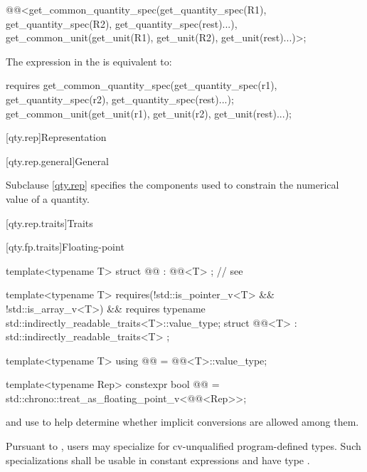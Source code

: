\begin{itemdescr}
\pnum
\returns
\begin{codeblock}
@@<get_common_quantity_spec(get_quantity_spec(R1{}), get_quantity_spec(R2{}),
                                     get_quantity_spec(rest)...),
            get_common_unit(get_unit(R1{}), get_unit(R2{}), get_unit(rest)...)>{};
\end{codeblock}

\pnum
\remarks
The expression in the  is equivalent to:
\begin{codeblock}
requires {
  get_common_quantity_spec(get_quantity_spec(r1), get_quantity_spec(r2),
                           get_quantity_spec(rest)...);
  get_common_unit(get_unit(r1), get_unit(r2), get_unit(rest)...);
}
\end{codeblock}
\end{itemdescr}

[qty.rep]{Representation}

[qty.rep.general]{General}

\pnum
Subclause \ref{qty.rep} specifies the components
used to constrain the numerical value of a quantity.

[qty.rep.traits]{Traits}

[qty.fp.traits]{Floating-point}

\begin{itemdecl}
template<typename T>
struct @@ : @@<T> {}; // see 

template<typename T>
  requires(!std::is_pointer_v<T> && !std::is_array_v<T>) &&
          requires { typename std::indirectly_readable_traits<T>::value_type; }
struct @@<T> : std::indirectly_readable_traits<T> {};

template<typename T>
using @@ = @@<T>::value_type;

template<typename Rep>
constexpr bool @@ =
  std::chrono::treat_as_floating_point_v<@@<Rep>>;
\end{itemdecl}

\begin{itemdescr}
\pnum
{} and  use 
to help determine whether implicit conversions are allowed among them.

\pnum
\remarks
Pursuant to ,
users may specialize 
for cv-unqualified program-defined types.
Such specializations shall be usable in constant expressions
and have type .
\end{itemdescr}

